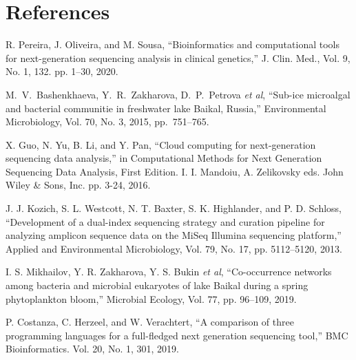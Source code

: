 \documentclass[a4paper]{jpconf}
\begin{document}

\section*{References}

\begin{thebibliography}{0}

 R. Pereira, J. Oliveira, and M. Sousa, ``Bioinformatics and computational tools for next-generation sequencing analysis in clinical genetics,'' J. Clin. Med., Vol. 9, No. 1, 132. pp. 1--30, 2020. 

 M.~V.~Bashenkhaeva, Y.~R.~Zakharova, D.~P.~Petrova \emph{et al}, ``Sub-ice microalgal and bacterial communitie in freshwater lake Baikal, Russia,'' Environmental Microbiology, Vol. 70, No. 3, 2015, pp.~751--765. 

 X. Guo, N. Yu, B. Li, and Y. Pan, ``Cloud computing for next-generation sequencing data analysis,'' in Computational Methods for Next Generation Sequencing Data Analysis, First Edition. I. I. Mandoiu, A. Zelikovsky eds. John Wiley \& Sons, Inc. pp. 3-24, 2016. \doi{}

 J. J. Kozich, S. L. Westcott, N. T. Baxter, S. K. Highlander, and P. D. Schloss, ``Development of a dual-index sequencing strategy and curation pipeline for analyzing amplicon sequence data on the MiSeq Illumina sequencing platform,'' Applied and Environmental Microbiology, Vol. 79, No. 17, pp. 5112–5120, 2013.

 I. S. Mikhailov, Y. R. Zakharova, Y. S. Bukin \emph{et al}, ``Co-occurrence networks among bacteria and microbial eukaryotes of lake Baikal during a spring phytoplankton bloom,'' Microbial Ecology, Vol. 77, pp. 96–109, 2019.  %


 P. Costanza, C. Herzeel, and W. Verachtert, ``A comparison of three
 programming languages for a full-fledged next generation sequencing tool,'' BMC Bioinformatics. Vol. 20, No. 1, 301, 2019. 


\end{thebibliography}
\end{document}
